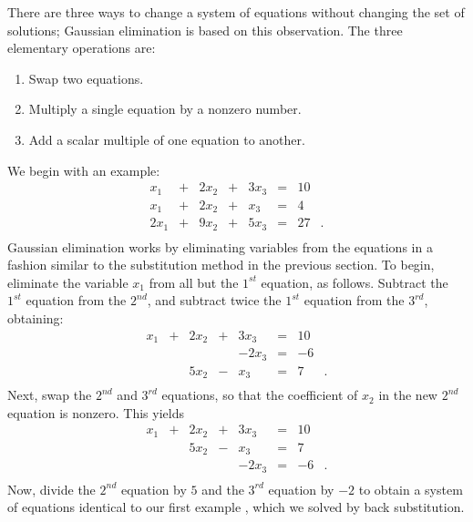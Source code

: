 \documentclass{ximera}
\begin{document}
There are three ways to change a system of equations without
changing the set of solutions; Gaussian elimination
 is based on this observation.  The
three elementary operations are:
\begin{enumerate}
\item   Swap two equations.
\item   Multiply a single equation by a nonzero number.
\item   Add a scalar multiple of one equation to another.
\end{enumerate}

We begin with an example:
\begin{equation}
\begin{array}{rcrcrcrl}
  x_1 & + & 2x_2 & + & 3x_3 & = &  10  & \\
  x_1 & + & 2x_2 & + &  x_3 & = &   4  & \\
 2x_1 & + & 9x_2 & + & 5x_3 & = &  27  & .\\
\end{array}
\end{equation}
Gaussian elimination works by eliminating variables from the
equations in a fashion similar to the substitution method in the
previous section.  To begin, eliminate the variable $x_1$ from
all but the $1^{st}$ equation, as follows.  Subtract the
$1^{st}$ equation from the $2^{nd}$, and subtract twice the
$1^{st}$ equation from the $3^{rd}$, obtaining:
\begin{equation}
\begin{array}{rcrcrcrl}
  x_1 & + & 2x_2 & + & 3x_3 & = &  10  & \\
      &   &      &   &-2x_3 & = &  -6  & \\
      &   & 5x_2 & - &  x_3 & = &   7  & .\\
\end{array}
\end{equation}
Next, swap the $2^{nd}$ and $3^{rd}$ equations, so that
the coefficient of $x_2$ in the new $2^{nd}$ equation is nonzero.
This yields
\begin{equation}
\begin{array}{rcrcrcrl}
  x_1 & + & 2x_2 & + & 3x_3 & = &  10  & \\
      &   & 5x_2 & - &  x_3 & = &   7  & \\
      &   &      &   &-2x_3 & = &  -6  & .\\
\end{array}
\end{equation}
Now, divide the $2^{nd}$ equation by $5$ and the $3^{rd}$
equation by $-2$ to obtain a system of equations identical to
our first example , which we solved by back
substitution.
\end{document}
